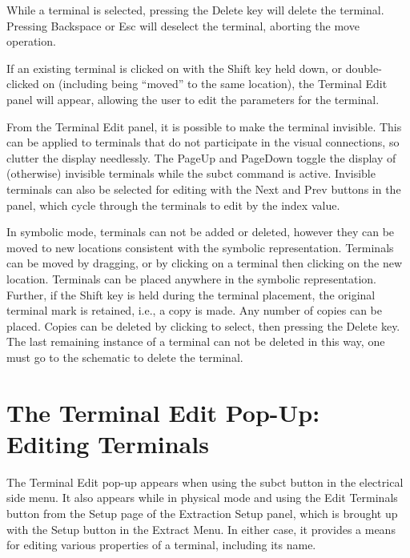 While a terminal is selected, pressing the {\kb Delete} key will
delete the terminal.  Pressing {\kb Backspace} or {\kb Esc} will
deselect the terminal, aborting the move operation.

If an existing terminal is clicked on with the {\kb Shift} key held
down, or double-clicked on (including being ``moved'' to the same
location), the {\cb Terminal Edit} panel will appear, allowing the
user to edit the parameters for the terminal.

From the {\cb Terminal Edit} panel, it is possible to make the
terminal invisible.  This can be applied to terminals that do not
participate in the visual connections, so clutter the display
needlessly.  The {\kb PageUp} and {\kb PageDown} toggle the display of
(otherwise) invisible terminals while the {\cb subct} command is
active.  Invisible terminals can also be selected for editing with the
{\cb Next} and {\cb Prev} buttons in the panel, which cycle through
the terminals to edit by the index value.

In symbolic mode, terminals can not be added or deleted, however they
can be moved to new locations consistent with the symbolic
representation.  Terminals can be moved by dragging, or by clicking on
a terminal then clicking on the new location.  Terminals can be placed
anywhere in the symbolic representation.  Further, if the {\kb Shift}
key is held during the terminal placement, the original terminal mark
is retained, i.e., a copy is made.  Any number of copies can be
placed.  Copies can be deleted by clicking to select, then pressing
the {\kb Delete} key.  The last remaining instance of a terminal can
not be deleted in this way, one must go to the schematic to delete the
terminal.


\section{The {\cb Terminal Edit} Pop-Up:  Editing Terminals}
\label{termedit}

The {\cb Terminal Edit} pop-up appears when using the {\cb subct}
button in the electrical side menu.  It also appears while in physical
mode and using the {\cb Edit Terminals} button from the {\cb Setup}
page of the {\cb Extraction Setup} panel, which is brought up with the
{\cb Setup} button in the {\cb Extract Menu}.  In either case, it
provides a means for editing various properties of a terminal,
including its name.

